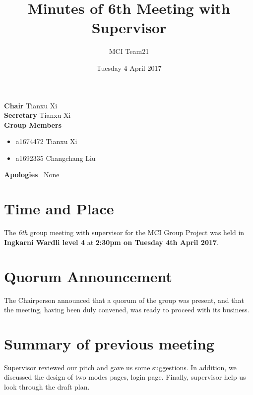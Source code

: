\documentclass[11pt, a4paper]{article}
\begin{document}
\title{Minutes of 6th Meeting with Supervisor}
\author{MCI Team21}
\date{Tuesday 4 April 2017}
\maketitle

\vspace*{15pt}

\begin{center}
\begin{flushleft}
  \textbf{Chair}      \qquad Tianxu Xi\\
  \textbf{Secretary}   \qquad Tianxu Xi\\
  \textbf{Group Members}
  \begin {itemize}
  		\item a1674472 Tianxu Xi
		\item a1692335 Changchang Liu

  \end{itemize} 
  \textbf{Apologies}  \ None\\
\end{flushleft}
\end{center}




\vspace*{10pt}

\section{Time and Place}
The \emph{6th} group meeting with supervisor for the MCI Group Project was held in \textbf{Ingkarni Wardli level 4} at \textbf{2:30pm on Tuesday 4th April 2017}.
 
\section{Quorum Announcement}
The Chairperson announced that a quorum of the group was present, and that the meeting, having been duly convened, was ready to proceed with its business.

\section{Summary of previous meeting}
Supervisor reviewed our pitch and gave us some suggestions. In addition, we discussed the design of two modes pages, login page. Finally, supervisor help us look through the draft plan.
\end{document}
